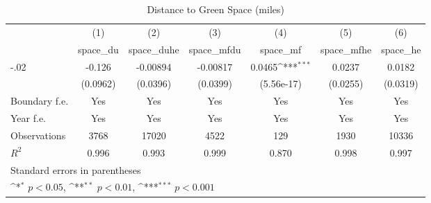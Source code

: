 \begin{table}[htbp]\centering
\def\sym#1{\ifmmode^{#1}\else\(^{#1}\)\fi}
\caption{Distance to Green Space (miles)}
\begin{tabular}{l*{6}{c}}
\hline\hline
                    &\multicolumn{1}{c}{(1)}&\multicolumn{1}{c}{(2)}&\multicolumn{1}{c}{(3)}&\multicolumn{1}{c}{(4)}&\multicolumn{1}{c}{(5)}&\multicolumn{1}{c}{(6)}\\
                    &\multicolumn{1}{c}{space\_du}&\multicolumn{1}{c}{space\_duhe}&\multicolumn{1}{c}{space\_mfdu}&\multicolumn{1}{c}{space\_mf}&\multicolumn{1}{c}{space\_mfhe}&\multicolumn{1}{c}{space\_he}\\
\hline
-.02                &      -0.126         &    -0.00894         &    -0.00817         &      0.0465\sym{***}&      0.0237         &      0.0182         \\
                    &    (0.0962)         &    (0.0396)         &    (0.0399)         &  (5.56e-17)         &    (0.0255)         &    (0.0319)         \\
[1em]
Boundary f.e.       &         Yes         &         Yes         &         Yes         &         Yes         &         Yes         &         Yes         \\
[1em]
Year f.e.           &         Yes         &         Yes         &         Yes         &         Yes         &         Yes         &         Yes         \\
\hline
Observations        &        3768         &       17020         &        4522         &         129         &        1930         &       10336         \\
\(R^{2}\)           &       0.996         &       0.993         &       0.999         &       0.870         &       0.998         &       0.997         \\
\hline\hline
\multicolumn{7}{l}{\footnotesize Standard errors in parentheses}\\
\multicolumn{7}{l}{\footnotesize \sym{*} \(p<0.05\), \sym{**} \(p<0.01\), \sym{***} \(p<0.001\)}\\
\end{tabular}
\end{table}
